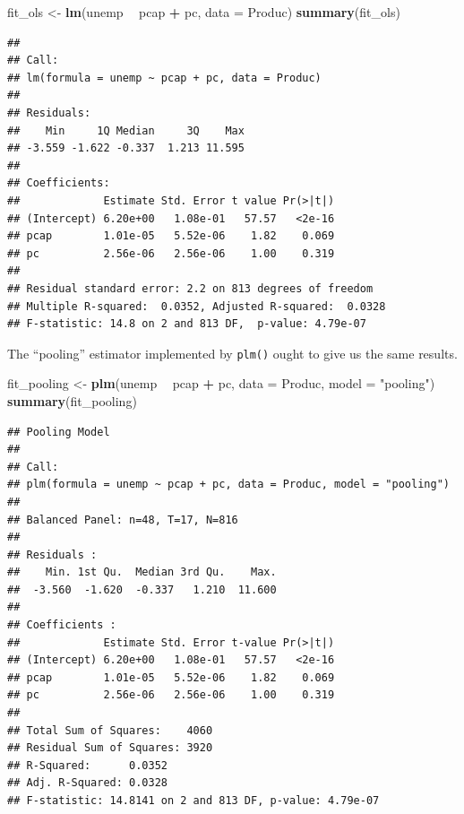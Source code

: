 \documentclass[12pt,oneside,openany]{book}
\newenvironment{Shaded}{\begin{snugshade}}{\end{snugshade}}
\newcommand{\KeywordTok}[1]{\textcolor[rgb]{0.13,0.29,0.53}{\textbf{#1}}}
\newcommand{\DataTypeTok}[1]{\textcolor[rgb]{0.13,0.29,0.53}{#1}}
\newcommand{\StringTok}[1]{\textcolor[rgb]{0.31,0.60,0.02}{#1}}
\newcommand{\OperatorTok}[1]{\textcolor[rgb]{0.81,0.36,0.00}{\textbf{#1}}}
\newcommand{\NormalTok}[1]{#1}
\begin{document}
\begin{Shaded}
\begin{Highlighting}[]
\NormalTok{fit_ols <-}\StringTok{ }\KeywordTok{lm}\NormalTok{(unemp }\OperatorTok{~}\StringTok{ }\NormalTok{pcap }\OperatorTok{+}\StringTok{ }\NormalTok{pc,}
              \DataTypeTok{data =}\NormalTok{ Produc)}
\KeywordTok{summary}\NormalTok{(fit_ols)}
\end{Highlighting}
\end{Shaded}

\begin{verbatim}
## 
## Call:
## lm(formula = unemp ~ pcap + pc, data = Produc)
## 
## Residuals:
##    Min     1Q Median     3Q    Max 
## -3.559 -1.622 -0.337  1.213 11.595 
## 
## Coefficients:
##             Estimate Std. Error t value Pr(>|t|)
## (Intercept) 6.20e+00   1.08e-01   57.57   <2e-16
## pcap        1.01e-05   5.52e-06    1.82    0.069
## pc          2.56e-06   2.56e-06    1.00    0.319
## 
## Residual standard error: 2.2 on 813 degrees of freedom
## Multiple R-squared:  0.0352, Adjusted R-squared:  0.0328 
## F-statistic: 14.8 on 2 and 813 DF,  p-value: 4.79e-07
\end{verbatim}

The ``pooling'' estimator implemented by \texttt{plm()} ought to give us
the same results.

\begin{Shaded}
\begin{Highlighting}[]
\NormalTok{fit_pooling <-}\StringTok{ }\KeywordTok{plm}\NormalTok{(unemp }\OperatorTok{~}\StringTok{ }\NormalTok{pcap }\OperatorTok{+}\StringTok{ }\NormalTok{pc,}
                   \DataTypeTok{data =}\NormalTok{ Produc,}
                   \DataTypeTok{model =} \StringTok{"pooling"}\NormalTok{)}
\KeywordTok{summary}\NormalTok{(fit_pooling)}
\end{Highlighting}
\end{Shaded}

\begin{verbatim}
## Pooling Model
## 
## Call:
## plm(formula = unemp ~ pcap + pc, data = Produc, model = "pooling")
## 
## Balanced Panel: n=48, T=17, N=816
## 
## Residuals :
##    Min. 1st Qu.  Median 3rd Qu.    Max. 
##  -3.560  -1.620  -0.337   1.210  11.600 
## 
## Coefficients :
##             Estimate Std. Error t-value Pr(>|t|)
## (Intercept) 6.20e+00   1.08e-01   57.57   <2e-16
## pcap        1.01e-05   5.52e-06    1.82    0.069
## pc          2.56e-06   2.56e-06    1.00    0.319
## 
## Total Sum of Squares:    4060
## Residual Sum of Squares: 3920
## R-Squared:      0.0352
## Adj. R-Squared: 0.0328
## F-statistic: 14.8141 on 2 and 813 DF, p-value: 4.79e-07
\end{verbatim}
\end{document}
